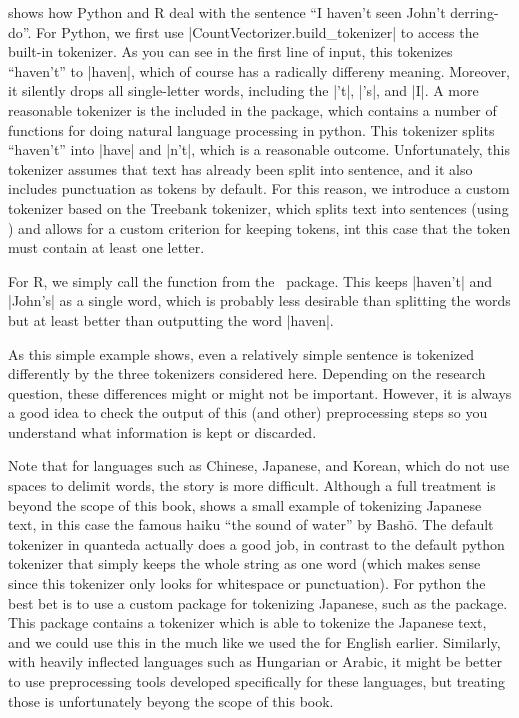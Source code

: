  shows how Python and R deal with the sentence ``I haven't seen John't derring-do''.
For Python, we first use |CountVectorizer.build_tokenizer| to access the built-in tokenizer.
As you can see in the first line of input, this tokenizes ``haven't'' to |haven|,
which of course has a radically differeny meaning. Moreover, it silently drops all single-letter words,
including the |'t|, |'s|, and |I|.
A more reasonable tokenizer is the  included in the  package, which contains a number of functions for doing natural language processing in python.
This tokenizer splits ``haven't'' into |have| and |n't|, which is a reasonable outcome.
Unfortunately, this tokenizer assumes that text has already been split into sentence,
and it also includes punctuation as tokens by default.
For this reason, we introduce a custom tokenizer based on the Treebank tokenizer,
which splits text into sentences (using ) and allows for a custom criterion for keeping tokens,
int this case that the token must contain at least one letter. 

For R, we simply call the  function from the \quanteda\ package.
This keeps |haven't| and |John's| as a single word, which is probably less desirable than splitting the words
but at least better than outputting the word |haven|.

As this simple example shows, even a relatively simple sentence is tokenized differently by the three tokenizers considered here.
Depending on the research question, these differences might or might not be important.
However, it is always a good idea to check the output of this (and other) preprocessing steps so you understand
what information is kept or discarded.



Note that for languages such as Chinese, Japanese, and Korean, which do not use spaces to delimit words, the story is more difficult.
Although a full treatment is beyond the scope of this book,  shows a small example of tokenizing Japanese text,
in this case the famous haiku ``the sound of water'' by Bash\={o}.
The default tokenizer in quanteda actually does a good job, in contrast to the default python tokenizer
that simply keeps the whole string as one word
(which makes sense since this tokenizer only looks for whitespace or punctuation).
For python the best bet is to use a custom package for tokenizing Japanese, such as the  package.
This package contains a tokenizer which is able to tokenize the Japanese text, and we could use this in the 
much like we used the  for English earlier.
Similarly, with heavily inflected languages such as Hungarian or Arabic,
it might be better to use preprocessing tools developed specifically for these languages, but treating those is unfortunately
beyong the scope of this book. 


